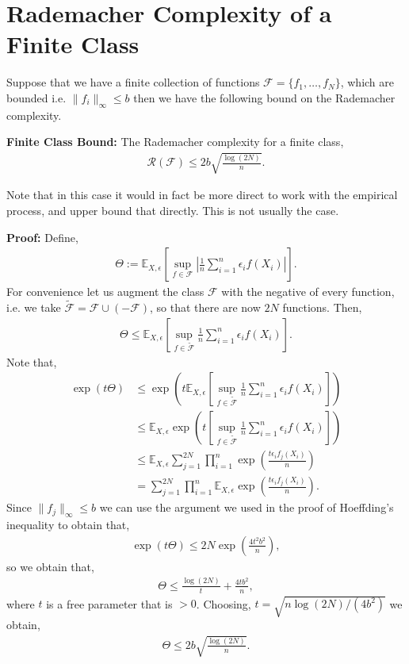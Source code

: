 \documentclass[twoside,12pt]{article}
\begin{document}
\section{Rademacher Complexity of a Finite Class}
Suppose that we have a finite collection of functions $\mathcal{F} = \{f_1,\ldots,f_N\}$, which are bounded i.e. $\|f_i\|_{\infty} \leq b$ then we have the following bound on the Rademacher complexity.

{\bf Finite Class Bound: } The Rademacher complexity for a finite class, 
\begin{align*}
\mathcal{R}(\mathcal{F}) \leq  2b \sqrt{\frac{\log(2N)}{n}}.
\end{align*}

Note that in this case it would in fact be more direct to work with the empirical process, and upper bound that directly. This is not usually the case.

{\bf Proof: } Define,
\begin{align*}
\Theta := \mathbb{E}_{X,\epsilon}  \left[ \sup_{f \in \mathcal{F}}   \left| \frac{1}{n} \sum_{i=1}^n \epsilon_i f(X_i) \right|\right].
\end{align*}
For convenience let us augment the class $\mathcal{F}$ with the negative of every function, i.e. we take
$\widetilde{\mathcal{F}} = \mathcal{F} \cup (- \mathcal{F})$, so that there are now $2N$ functions. Then,
\begin{align*}
\Theta \leq \mathbb{E}_{X,\epsilon}  \left[ \sup_{f \in \widetilde{\mathcal{F}}}  \frac{1}{n} \sum_{i=1}^n \epsilon_i f(X_i) \right].
\end{align*}
Note that,
\begin{align*}
\exp (t \Theta) &\leq \exp \left(t  \mathbb{E}_{X,\epsilon}  \left[ \sup_{f \in \widetilde{\mathcal{F}}}  \frac{1}{n} \sum_{i=1}^n \epsilon_i f(X_i) \right]\right) \\
&\leq  \mathbb{E}_{X,\epsilon} \exp \left(t\left[ \sup_{f \in \widetilde{\mathcal{F}}}   \frac{1}{n} \sum_{i=1}^n \epsilon_i f(X_i) \right]\right) \\
&\leq \mathbb{E}_{X,\epsilon} \sum_{j=1}^{2N} \prod_{i=1}^n \exp \left(\frac{t   \epsilon_i f_j(X_i) }{n}\right) \\
&= \sum_{j=1}^{2N} \prod_{i=1}^n \mathbb{E}_{X,\epsilon}  \exp \left(\frac{t   \epsilon_i f_j(X_i) }{n}\right).
\end{align*}
Since $\|f_j\|_{\infty} \leq b$ we can use the argument we used in the proof of Hoeffding's inequality to obtain that,
\begin{align*}
\exp (t \Theta) \leq 2N \exp  \left(\frac{4t^2 b^2  }{n}\right),
\end{align*}
so we obtain that, 
\begin{align*}
\Theta \leq \frac{\log (2N)}{t} +   \frac{4t b^2  }{n},
\end{align*}
where $t$ is a free parameter that is $> 0$. Choosing, $t = \sqrt{n \log(2N) /(4b^2)}$ we obtain,
\begin{align*}
\Theta \leq 2b \sqrt{\frac{\log(2N)}{n}}.
\end{align*}
\end{document}
